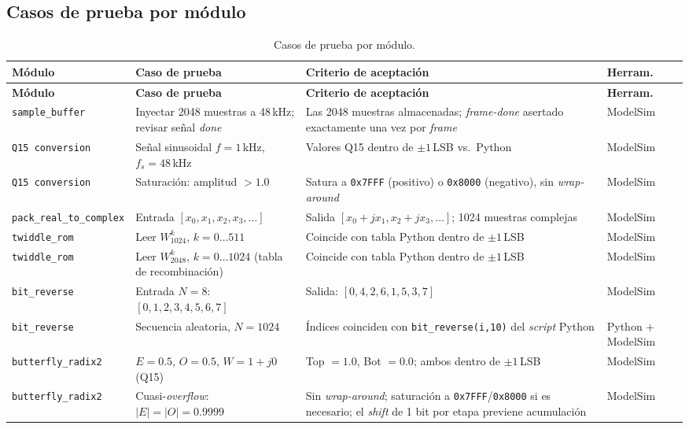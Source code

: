 \documentclass[11pt,a4paper]{article}
\begin{document}
\subsection{Casos de prueba por módulo}
\renewcommand{\arraystretch}{1.25}
\begin{longtable}{@{}p{3.2cm} p{4.6cm} p{4.6cm} p{2.0cm}@{}}
\caption{Casos de prueba por módulo.}\label{tab:testcases}\\
\toprule
\textbf{Módulo} & \textbf{Caso de prueba} & \textbf{Criterio de aceptación} & \textbf{Herram.}\\
\midrule
\endfirsthead
\toprule
\textbf{Módulo} & \textbf{Caso de prueba} & \textbf{Criterio de aceptación} & \textbf{Herram.}\\
\midrule
\endhead
\bottomrule
\endfoot
\texttt{sample\_buffer} & Inyectar 2048 muestras a 48\,kHz; revisar señal \emph{done} & Las 2048 muestras almacenadas; \emph{frame-done} asertado exactamente una vez por \emph{frame} & ModelSim \\
\texttt{Q15 conversion} & Señal sinusoidal $f=1$\,kHz, $f_s=48$\,kHz & Valores Q15 dentro de $\pm1$\,LSB vs.\ Python & ModelSim \\
\texttt{Q15 conversion} & Saturación: amplitud $>1.0$ & Satura a \texttt{0x7FFF} (positivo) o \texttt{0x8000} (negativo), sin \emph{wrap-around} & ModelSim \\
\texttt{pack\_real\_to\_complex} & Entrada $[x_0,x_1,x_2,x_3,\dots]$ & Salida $[x_0+jx_1, x_2+jx_3,\dots]$; 1024 muestras complejas & ModelSim \\
\texttt{twiddle\_rom} & Leer $W_{1024}^{k}$, $k=0\dots511$ & Coincide con tabla Python dentro de $\pm1$\,LSB & ModelSim \\
\texttt{twiddle\_rom} & Leer $W_{2048}^{k}$, $k=0\dots1024$ (tabla de recombinación) & Coincide con tabla Python dentro de $\pm1$\,LSB & ModelSim \\
\texttt{bit\_reverse} & Entrada $N=8$: $[0,1,2,3,4,5,6,7]$ & Salida: $[0,4,2,6,1,5,3,7]$ & ModelSim \\
\texttt{bit\_reverse} & Secuencia aleatoria, $N=1024$ & Índices coinciden con \texttt{bit\_reverse(i,10)} del \emph{script} Python & Python + ModelSim \\
\texttt{butterfly\_radix2} & $E=0.5$, $O=0.5$, $W=1+j0$ (Q15) & Top $=1.0$, Bot $=0.0$; ambos dentro de $\pm1$\,LSB & ModelSim \\
\texttt{butterfly\_radix2} & Cuasi-\emph{overflow}: $|E|=|O|=0.9999$ & Sin \emph{wrap-around}; saturación a \texttt{0x7FFF}/\texttt{0x8000} si es necesario; el \emph{shift} de 1 bit por etapa previene acumulación & ModelSim \\

\end{longtable}
\end{document}
